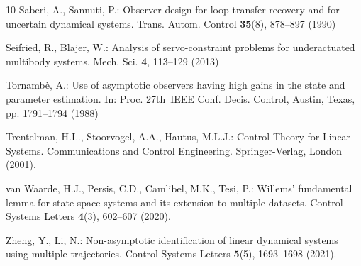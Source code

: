 \documentclass[ envcountsect, envcountsame]{svjour3}
\begin{document}
\begin{thebibliography}{10}
Saberi, A., Sannuti, P.: Observer design for loop transfer recovery and for
  uncertain dynamical systems.
 Trans. Autom. Control \textbf{35}(8), 878--897 (1990)

Seifried, R., Blajer, W.: Analysis of servo-constraint problems for
  underactuated multibody systems.
\newblock Mech. Sci. \textbf{4}, 113--129 (2013)

Tornamb{\`{e}}, A.: Use of asymptotic observers having high gains in the state
  and parameter estimation.
\newblock In: Proc. 27th~{IEEE} Conf. Decis. Control, Austin, Texas, pp.
  1791--1794 (1988)

Trentelman, H.L., Stoorvogel, A.A., Hautus, M.L.J.: Control Theory for Linear
  Systems.
\newblock Communications and Control Engineering. Springer-Verlag, London
  (2001).
\newblock {}

van Waarde, H.J., Persis, C.D., Camlibel, M.K., Tesi, P.: Willems' fundamental
  lemma for state-space systems and its extension to multiple datasets.
 Control Systems Letters \textbf{4}(3), 602--607 (2020).
\newblock {}

Zheng, Y., Li, N.: Non-asymptotic identification of linear dynamical systems
  using multiple trajectories.
 Control Systems Letters \textbf{5}(5), 1693--1698 (2021).
\newblock {}

\end{thebibliography}
%
%
\end{document}
